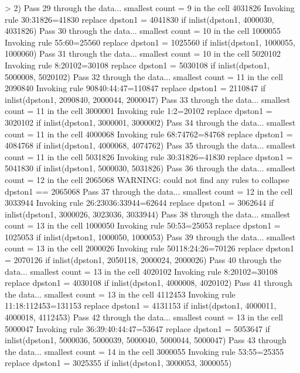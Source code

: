 > 2)
Pass 29 through the data...
  smallest count = 9 in the cell      4031826
  Invoking rule 30:31826=41830
  replace dpston1 = 4041830 if inlist(dpston1, 4000030, 4031826)
Pass 30 through the data...
  smallest count = 10 in the cell      1000055
  Invoking rule 55:60=25560
  replace dpston1 = 1025560 if inlist(dpston1, 1000055, 1000060)
Pass 31 through the data...
  smallest count = 10 in the cell      5020102
  Invoking rule 8:20102=30108
  replace dpston1 = 5030108 if inlist(dpston1, 5000008, 5020102)
Pass 32 through the data...
  smallest count = 11 in the cell      2090840
  Invoking rule 90840:44:47=110847
  replace dpston1 = 2110847 if inlist(dpston1, 2090840, 2000044, 2000047)
Pass 33 through the data...
  smallest count = 11 in the cell      3000001
  Invoking rule 1:2=20102
  replace dpston1 = 3020102 if inlist(dpston1, 3000001, 3000002)
Pass 34 through the data...
  smallest count = 11 in the cell      4000068
  Invoking rule 68:74762=84768
  replace dpston1 = 4084768 if inlist(dpston1, 4000068, 4074762)
Pass 35 through the data...
  smallest count = 11 in the cell      5031826
  Invoking rule 30:31826=41830
  replace dpston1 = 5041830 if inlist(dpston1, 5000030, 5031826)
Pass 36 through the data...
  smallest count = 12 in the cell      2065068
  WARNING: could not find any rules to collapse dpston1 == 2065068
Pass 37 through the data...
  smallest count = 12 in the cell      3033944
  Invoking rule 26:23036:33944=62644
  replace dpston1 = 3062644 if inlist(dpston1, 3000026, 3023036, 3033944)
Pass 38 through the data...
  smallest count = 13 in the cell      1000050
  Invoking rule 50:53=25053
  replace dpston1 = 1025053 if inlist(dpston1, 1000050, 1000053)
Pass 39 through the data...
  smallest count = 13 in the cell      2000026
  Invoking rule 50118:24:26=70126
  replace dpston1 = 2070126 if inlist(dpston1, 2050118, 2000024, 2000026)
Pass 40 through the data...
  smallest count = 13 in the cell      4020102
  Invoking rule 8:20102=30108
  replace dpston1 = 4030108 if inlist(dpston1, 4000008, 4020102)
Pass 41 through the data...
  smallest count = 13 in the cell      4112453
  Invoking rule 11:18:112453=131153
  replace dpston1 = 4131153 if inlist(dpston1, 4000011, 4000018, 4112453)
Pass 42 through the data...
  smallest count = 13 in the cell      5000047
  Invoking rule 36:39:40:44:47=53647
  replace dpston1 = 5053647 if inlist(dpston1, 5000036, 5000039, 5000040, 5000044, 5000047)
Pass 43 through the data...
  smallest count = 14 in the cell      3000055
  Invoking rule 53:55=25355
  replace dpston1 = 3025355 if inlist(dpston1, 3000053, 3000055)
